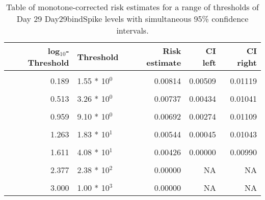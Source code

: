 \documentclass[]{article}
\begin{document}
\begin{table}[!h]

\caption{\label{tab:unnamed-chunk-53}Table of monotone-corrected risk estimates for a range of thresholds of Day 29 Day29bindSpike levels with simultaneous 95\% confidence intervals.}
\centering
\begin{tabular}[t]{rlrrr}
\toprule
log$_{10}$-Threshold & Threshold & Risk estimate & CI left & CI right\\
\midrule
\cellcolor{gray!6}{-0.813} & \cellcolor{gray!6}{1.54 * 10$^{1}$} & \cellcolor{gray!6}{0.00857} & \cellcolor{gray!6}{0.00570} & \cellcolor{gray!6}{0.01144}\\
0.189 & 1.55 * 10$^{0}$ & 0.00814 & 0.00509 & 0.01119\\
\cellcolor{gray!6}{0.341} & \cellcolor{gray!6}{2.19 * 10$^{0}$} & \cellcolor{gray!6}{0.00797} & \cellcolor{gray!6}{0.00493} & \cellcolor{gray!6}{0.01100}\\
0.513 & 3.26 * 10$^{0}$ & 0.00737 & 0.00434 & 0.01041\\
\cellcolor{gray!6}{0.792} & \cellcolor{gray!6}{6.19 * 10$^{0}$} & \cellcolor{gray!6}{0.00723} & \cellcolor{gray!6}{0.00380} & \cellcolor{gray!6}{0.01066}\\
0.959 & 9.10 * 10$^{0}$ & 0.00692 & 0.00274 & 0.01109\\
\cellcolor{gray!6}{1.113} & \cellcolor{gray!6}{1.30 * 10$^{1}$} & \cellcolor{gray!6}{0.00613} & \cellcolor{gray!6}{0.00133} & \cellcolor{gray!6}{0.01092}\\
1.263 & 1.83 * 10$^{1}$ & 0.00544 & 0.00045 & 0.01043\\
\cellcolor{gray!6}{1.491} & \cellcolor{gray!6}{3.10 * 10$^{1}$} & \cellcolor{gray!6}{0.00426} & \cellcolor{gray!6}{0.00000} & \cellcolor{gray!6}{0.00922}\\
1.611 & 4.08 * 10$^{1}$ & 0.00426 & 0.00000 & 0.00990\\
\cellcolor{gray!6}{1.729} & \cellcolor{gray!6}{5.36 * 10$^{1}$} & \cellcolor{gray!6}{0.00348} & \cellcolor{gray!6}{0.00000} & \cellcolor{gray!6}{0.00790}\\
2.377 & 2.38 * 10$^{2}$ & 0.00000 & NA & NA\\
\cellcolor{gray!6}{2.699} & \cellcolor{gray!6}{5.00 * 10$^{2}$} & \cellcolor{gray!6}{0.00000} & \cellcolor{gray!6}{NA} & \cellcolor{gray!6}{NA}\\
3.000 & 1.00 * 10$^{3}$ & 0.00000 & NA & NA\\
\bottomrule
\end{tabular}
\end{table}
\end{document}
